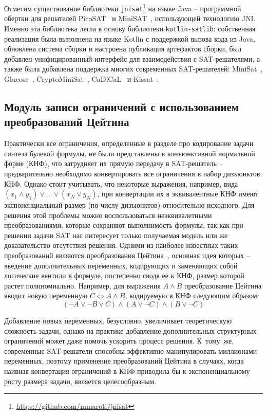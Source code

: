 Отметим существование библиотеки \texttt{jnisat}\footnote{\url{https://github.com/mmaroti/jnisat}} на языке Java \--- программной обертки для решателей PicoSAT~\cite{biere2008} и MiniSAT~\cite{minisat}, использующей технологию JNI.
Именно эта библиотека легла в основу библиотеки \texttt{kotlin-satlib}: собственная реализация была выполнена на языке Kotlin с поддержкой вызова кода из Java, обновлена система сборки и настроена публикация артефактов сборки, был добавлен унифицированный интерфейс для взаимодействия с SAT-решателями, а также была добавлена поддержка многих современных SAT-решателей: MiniSat~\cite{minisat}, Glucose~\cite{glucose}, CryptoMiniSat~\cite{cryptominisat}, CaDiCaL~\cite{cadical} и Kissat~\cite{kissat}.

\subsection{Модуль записи ограничений с использованием преобразований Цейтина}

Практически все ограничения, определенные в разделе про кодирование задачи синтеза булевой формулы, не были представлены в конъюнктивной нормальной форме (КНФ), что затрудняет их прямую передачу в SAT-решатель \--- предварительно необходимо конвертировать все ограничения в набор дизъюнктов КНФ.
Однако стоит учитывать, что некоторые выражения, например, вида ${(x_{1} \land y_{1})} \lor \ldots \lor {(x_{N} \lor y_{N})}$, при конвертации их в эквивалентные КНФ имеют экспоненциальный размер (по числу дизъюнктов) относительно исходного.
Для решения этой проблемы можно воспользоваться неэквивалетными преобразованиями, которые сохраняют выполнимость формулы, так как при решении задачи SAT нас интересует только получаемая модель или же доказательство отсутствия решения.
Одними из наиболее известных таких преобразований являются преобразования Цейтина~\cite{tseitin1970}, основная идея которых \--- введение дополнительных переменных, кодирующих и заменяющих собой логические вентили в формуле, постепенно сводя ее к КНФ, размер которой растет полиномиально.
Например, для выражения $A \land B$ преобразование Цейтина вводит новую переменную $C \iff {A \land B}$, кодируемую в КНФ следующим образом:
\[
    (\neg A \lor \neg B \lor C)
    \land
    (A \lor \neg C)
    \land
    (B \lor \neg C)
\]

Добавление новых переменных, безусловно, увеличивает теоретическую сложность задачи, однако на практике добавление дополнительных структурных ограничений может даже помочь ускорить процесс решения.
К~тому~же, современные SAT-решатели способны эффективно манипулировать миллионами переменных, поэтому применение преобразований Цейтина в случаях, когда наивная конвертация ограничений в КНФ приводила бы к экспоненциальному росту размера задачи, является целесообразным.

